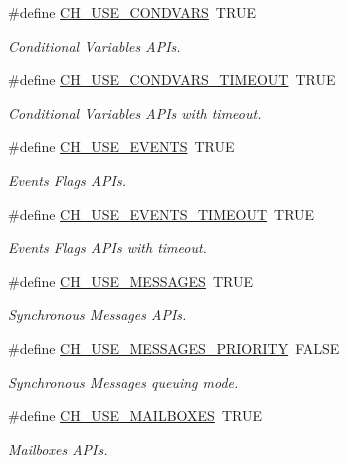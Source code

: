 \begin{DoxyCompactItemize}
\#define \hyperlink{group__config_ga24fd7fe539fd6094b5db3215e1721c9c}{C\+H\+\_\+\+U\+S\+E\+\_\+\+C\+O\+N\+D\+V\+A\+R\+S}~T\+R\+U\+E
\begin{DoxyCompactList}\small\item\em Conditional Variables A\+P\+Is. \end{DoxyCompactList}\item 
\#define \hyperlink{group__config_gaccc2c032c409bced696f75877e270979}{C\+H\+\_\+\+U\+S\+E\+\_\+\+C\+O\+N\+D\+V\+A\+R\+S\+\_\+\+T\+I\+M\+E\+O\+U\+T}~T\+R\+U\+E
\begin{DoxyCompactList}\small\item\em Conditional Variables A\+P\+Is with timeout. \end{DoxyCompactList}\item 
\#define \hyperlink{group__config_ga5e3ac686cd33ad40a89aaaf97b3dc781}{C\+H\+\_\+\+U\+S\+E\+\_\+\+E\+V\+E\+N\+T\+S}~T\+R\+U\+E
\begin{DoxyCompactList}\small\item\em Events Flags A\+P\+Is. \end{DoxyCompactList}\item 
\#define \hyperlink{group__config_ga64a6ad752750f42fe2474d3e7f191a71}{C\+H\+\_\+\+U\+S\+E\+\_\+\+E\+V\+E\+N\+T\+S\+\_\+\+T\+I\+M\+E\+O\+U\+T}~T\+R\+U\+E
\begin{DoxyCompactList}\small\item\em Events Flags A\+P\+Is with timeout. \end{DoxyCompactList}\item 
\#define \hyperlink{group__config_ga3823e336736d522bbfaf780c86746482}{C\+H\+\_\+\+U\+S\+E\+\_\+\+M\+E\+S\+S\+A\+G\+E\+S}~T\+R\+U\+E
\begin{DoxyCompactList}\small\item\em Synchronous Messages A\+P\+Is. \end{DoxyCompactList}\item 
\#define \hyperlink{group__config_gaf48947f33ed7a44a7701d84d83d94a1c}{C\+H\+\_\+\+U\+S\+E\+\_\+\+M\+E\+S\+S\+A\+G\+E\+S\+\_\+\+P\+R\+I\+O\+R\+I\+T\+Y}~F\+A\+L\+S\+E
\begin{DoxyCompactList}\small\item\em Synchronous Messages queuing mode. \end{DoxyCompactList}\item 
\#define \hyperlink{group__config_ga6cf1736db681617019f96c4c209d2716}{C\+H\+\_\+\+U\+S\+E\+\_\+\+M\+A\+I\+L\+B\+O\+X\+E\+S}~T\+R\+U\+E
\begin{DoxyCompactList}\small\item\em Mailboxes A\+P\+Is. \end{DoxyCompactList}\item 

\end{DoxyCompactItemize}
